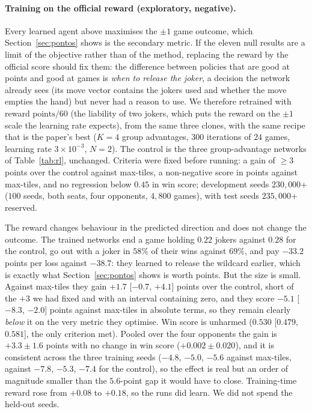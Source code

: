 \documentclass[11pt]{article}
\begin{document}
\paragraph{Training on the official reward (exploratory, negative).} Every learned agent above maximises the $\pm1$ game outcome, which Section~\ref{sec:pontos} shows is the secondary metric. If the eleven null results are a limit of the objective rather than of the method, replacing the reward by the official score should fix them: the difference between policies that are good at points and good at games is \emph{when to release the joker}, a decision the network already sees (its move vector contains the jokers used and whether the move empties the hand) but never had a reason to use. We therefore retrained with reward $\text{points}/60$ (the liability of two jokers, which puts the reward on the $\pm1$ scale the learning rate expects), from the same three clones, with the same recipe that is the paper's best ($K{=}4$ group advantages, $300$ iterations of $24$ games, learning rate $3\times10^{-3}$, $N=2$). The control is the three group-advantage networks of Table~\ref{tab:rl}, unchanged. Criteria were fixed before running: a gain of $\ge3$ points over the control against max-tiles, a non-negative score in points against max-tiles, and no regression below $0.45$ in win score; development seeds $230{,}000$+ ($100$ seeds, both seats, four opponents, $4{,}800$ games), with test seeds $235{,}000$+ reserved.

The reward changes behaviour in the predicted direction and does not change the outcome. The trained networks end a game holding $0.22$ jokers against $0.28$ for the control, go out with a joker in $58\%$ of their wins against $69\%$, and pay $-33.2$ points per loss against $-38.7$: they learned to release the wildcard earlier, which is exactly what Section~\ref{sec:pontos} shows is worth points. But the size is small. Against max-tiles they gain $+1.7$ [$-0.7$, $+4.1$] points over the control, short of the $+3$ we had fixed and with an interval containing zero, and they score $-5.1$ [$-8.3$, $-2.0$] points against max-tiles in absolute terms, so they remain clearly \emph{below} it on the very metric they optimise. Win score is unharmed ($0.530$ [$0.479$, $0.581$], the only criterion met). Pooled over the four opponents the gain is $+3.3\pm1.6$ points with no change in win score ($+0.002\pm0.020$), and it is consistent across the three training seeds ($-4.8$, $-5.0$, $-5.6$ against max-tiles, against $-7.8$, $-5.3$, $-7.4$ for the control), so the effect is real but an order of magnitude smaller than the $5.6$-point gap it would have to close. Training-time reward rose from $+0.08$ to $+0.18$, so the runs did learn. We did not spend the held-out seeds.
\end{document}

